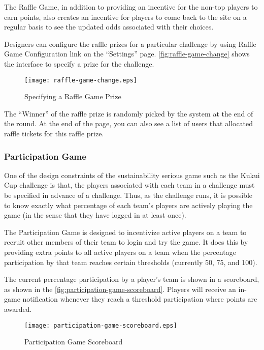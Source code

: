 The Raffle Game, in addition to providing an incentive for the non-top players to earn points, also creates an incentive for players to come back to the site on a regular basis to see the updated odds associated with their choices.

Designers can configure the raffle prizes for a particular challenge by using Raffle Game Configuration link on the ``Settings'' page. \autoref{fig:raffle-game-change} shows the interface to specify a prize for the challenge.

\begin{figure}[!ht]
  \center
  \texttt{[image: raffle-game-change.eps]}
  \caption{Specifying a Raffle Game Prize}
  \label{fig:raffle-game-change}
\end{figure}

The ``Winner'' of the raffle prize is randomly picked by the system at the end of the round. At the end of the page, you can also see a list of users that allocated raffle tickets for this raffle prize.

\clearpage

\subsubsection{Participation Game}

One of the design constraints of the sustainability serious game such as the Kukui Cup challenge is that, the players associated with each team in a challenge must be specified in advance of a challenge. Thus, as the challenge runs, it is possible to know exactly what percentage of each team's players are actively playing the game (in the sense that they have logged in at least once).

The Participation Game is designed to incentivize active players on a team to recruit other members of their team to login and try the game. It does this by providing extra points to all active players on a team when the percentage participation by that team reaches certain thresholds (currently 50, 75, and 100).

The current percentage participation by a player's team is shown in a scoreboard, as shown in the \autoref{fig:participation-game-scoreboard}. Players will receive an in-game notification whenever they reach a threshold participation where points are awarded.

\begin{figure}[!ht]
  \center
  \texttt{[image: participation-game-scoreboard.eps]}
  \caption{Participation Game Scoreboard}
  \label{fig:participation-game-scoreboard}
\end{figure}

